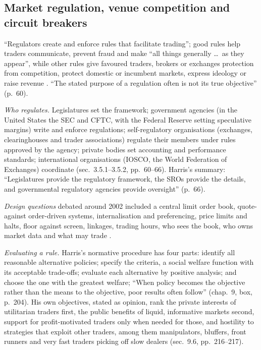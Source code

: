 \subsection{Market regulation, venue competition and circuit breakers}

\begin{qfdefinition}\label{def:market-regulation-design}
 ``Regulators create and enforce rules that facilitate trading''; good rules help traders communicate, prevent fraud and make ``all things generally \dots\ as they appear'', while other rules give favoured traders, brokers or exchanges protection from competition, protect domestic or incumbent markets, express ideology or raise revenue \citep[chap.~3, sec.~3.5, pp.~59--60]{alpha-harris}. ``The stated purpose of a regulation often is not its true objective'' (p.~60).

\emph{Who regulates.} Legislatures set the framework; government agencies (in the United States the SEC and CFTC, with the Federal Reserve setting speculative margins) write and enforce regulations; self-regulatory organisations (exchanges, clearinghouses and trader associations) regulate their members under rules approved by the agency; private bodies set accounting and performance standards; international organisations (IOSCO, the World Federation of Exchanges) coordinate (sec.~3.5.1--3.5.2, pp.~60--66). Harris's summary: ``Legislatures provide the regulatory framework, the SROs provide the details, and governmental regulatory agencies provide oversight'' (p.~66).

\emph{Design questions} debated around 2002 included a central limit order book, quote- against order-driven systems, internalisation and preferencing, price limits and halts, floor against screen, linkages, trading hours, who sees the book, who owns market data and what may trade \citep[chap.~9, p.~202]{alpha-harris}.

 \emph{Evaluating a rule.} Harris's normative procedure has four parts: identify all reasonable alternative policies; specify the criteria, a social welfare function with its acceptable trade-offs; evaluate each alternative by positive analysis; and choose the one with the greatest welfare; ``When policy becomes the objective rather than the means to the objective, poor results often follow'' (chap.~9, box, p.~204). His own objectives, stated as opinion, rank the private interests of utilitarian traders first, the public benefits of liquid, informative markets second, support for profit-motivated traders only when needed for those, and hostility to strategies that exploit other traders, among them manipulators, bluffers, front runners and very fast traders picking off slow dealers (sec.~9.6, pp.~216--217).


\end{qfdefinition}

